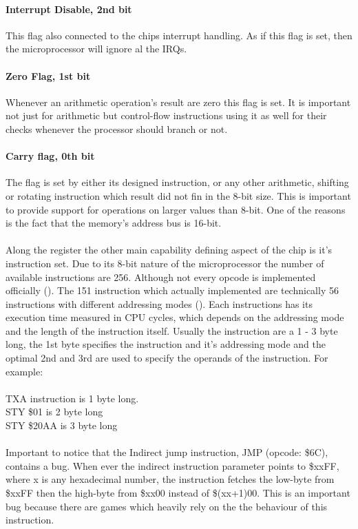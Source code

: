 \documentclass[]{report}
\begin{document}
\paragraph{Interrupt Disable, 2nd bit}
This flag also connected to the chips interrupt handling. As if this flag is set, then the microprocessor will ignore al the IRQs. 

\paragraph{Zero Flag, 1st bit}
Whenever an arithmetic operation's result are zero this flag is set. It is important not just for arithmetic but control-flow instructions using it as well for their checks whenever the processor should branch or not.

\paragraph{Carry flag, 0th bit}
The flag is set by either its designed instruction, or any other arithmetic, shifting or rotating instruction which result did not fin in the 8-bit size.
This is important to provide support for operations on larger values than 8-bit. One of the reasons is the fact that the memory's address bus is 16-bit. 

\paragraph{ }
Along the register the other main capability defining aspect of the chip is it's instruction set. Due to its 8-bit nature of the microprocessor the number of available instructions are 256. Although not every opcode is implemented officially (\cite{INST}). The 151 instruction which actually implemented are technically 56 instructions with different addressing modes (\cite{ADDR}). Each instructions has its execution time measured in CPU cycles, which depends on the addressing mode and the length of the instruction itself. Usually the instruction are a 1 - 3 byte long, the 1st byte specifies the instruction and it's addressing mode and the optimal 2nd and 3rd are used to specify the operands of the instruction. For example:
\\
\\
TXA instruction is 1 byte long.
\\
STY \$01 is 2 byte long 
\\
STY \$20AA is 3 byte long
\\
\\
Important to notice that the Indirect jump instruction, JMP (opcode: \$6C), contains a bug. When ever the indirect instruction parameter points to \$xxFF, where x is any hexadecimal number, the instruction fetches the low-byte from \$xxFF then the high-byte from \$xx00 instead of \$(xx+1)00. This is an important bug because there are games which heavily rely on the the behaviour of this instruction.
\end{document}

